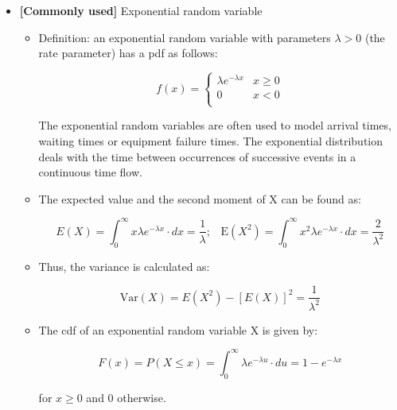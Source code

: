 \documentclass[12pt]{report}
\renewcommand{\_}{\kern-1.5pt\textunderscore\kern-1.5pt}
\begin{document}
\begin{itemize}
	\item \textbf{[Commonly used] }Exponential random variable\par

\begin{itemize}
	\item Definition: an exponential random variable with parameters  \(  \lambda >0 \)  (the rate parameter) has a pdf as follows:\par

 \[ f \left( x \right) = \left\{ \begin{matrix}
 \lambda e^{- \lambda x}  &  x \geq 0\\
0  &  x<0\\
\end{matrix}
  \] \par

The exponential random variables are often used to model arrival times, waiting times or equipment failure times. The exponential distribution deals with the time between occurrences of successive events in a continuous time flow. \par

	\item The expected value and the second moment of X can be found as:\par

 \[ E \left( X \right) = \int _{0}^{\infty}x \lambda e^{- \lambda x} \cdot dx=\frac{1}{ \lambda }\text{;~~ E} \left( X^{2} \right) = \int _{0}^{\infty}x^{2} \lambda e^{- \lambda x} \cdot dx=\frac{2}{ \lambda ^{2}} \] \par

	\item Thus, the variance is calculated as:\par

 \[ \mathrm{Var} \left( X \right) =E \left( X^{2} \right) - \left[ E \left( X \right)  \right] ^{2}=\frac{1}{ \lambda ^{2}} \] \par

	\item The cdf of an exponential random variable X is given by:\par

 \[ F \left( x \right) =P \left( X \leq x \right) = \int _{0}^{\infty} \lambda e^{- \lambda u} \cdot du=1-e^{- \lambda x} \] \par

for  \( x \geq 0 \)  and 0 otherwise.\par


\end{itemize}
\end{itemize}
\end{document}
